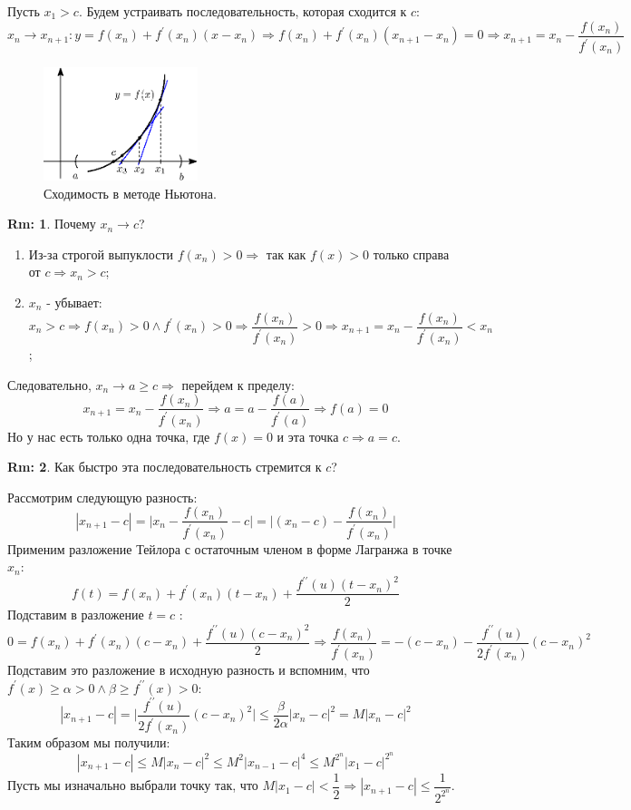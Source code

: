 \documentclass[12pt]{article}
\theoremstyle{definition}
\newtheorem{rem}{Rm:}
\begin{document}
Пусть $x_1 > c$. Будем устраивать последовательность, которая сходится к $c$: 
$$x_n \to x_{n+1} \colon y = f(x_n) + f^\prime(x_n)(x - x_n) \Rightarrow f(x_n) + f^\prime(x_n)(x_{n+1} - x_n) = 0 \Rightarrow x_{n+1} = x_n - \dfrac{ f(x_n)}{f^\prime(x_n)}$$
\begin{figure}[H]
	\centering
	\includegraphics[width=0.4\textwidth]{28_4.eps}
	\caption{Сходимость в методе Ньютона.}
	\label{28_4}
\end{figure}
\newpage
\begin{rem}
	Почему $x_n \to c$?
	\begin{enumerate}[label={(\arabic*)}]
		\item Из-за строгой выпуклости $f(x_{n}) > 0 \Rightarrow$ так как $f(x) > 0$ только справа от $c \Rightarrow  x_{n} > c$;
		\item $x_n$ - убывает: $x_n >c \Rightarrow f(x_n) > 0\wedge f^\prime(x_n) > 0 \Rightarrow \dfrac{f(x_n)}{f^\prime(x_n)}>0 \Rightarrow x_{n+1} = x_n - \dfrac{f(x_n)}{f^\prime(x_n)} < x_n$;
	\end{enumerate}
	Следовательно, $x_n \to a \geq c \Rightarrow $ перейдем к пределу: 
	$$x_{n+1} = x_n - \dfrac{f(x_n)}{f^\prime(x_n)} \Rightarrow a = a - \dfrac{f(a)}{f^\prime(a)} \Rightarrow f(a) = 0 $$ 
	Но у нас есть только одна точка, где $f(x) = 0$ и эта точка $c\Rightarrow a = c$.
\end{rem}

\begin{rem}
	Как быстро эта последовательность стремится к $c$? 
	
	Рассмотрим следующую разность:
	$$|x_{n+1} - c| = \bigg|x_n - \dfrac{f(x_n)}{f^\prime(x_n)} - c\bigg| = \bigg|(x_n - c) - \dfrac{f(x_n)}{f^\prime(x_n)}\bigg|$$
	Применим разложение Тейлора с остаточным членом в форме Лагранжа в точке $x_n$: 
	$$f(t) = f(x_n) + f^\prime(x_n)(t - x_n) + \dfrac{f^{\prime\prime}(u)(t - x_n)^2}{2}$$
	Подставим в разложение $t = c$ : 
	$$0 = f(x_n) + f^\prime(x_n)(c - x_n) + \dfrac{f^{\prime\prime}(u)(c - x_n)^2}{2} \Rightarrow \dfrac{f(x_n)}{f^\prime(x_n)} = - (c-x_n) - \dfrac{f^{\prime\prime}(u)}{2f^\prime(x_n)}(c - x_n)^2 $$
	Подставим это разложение в исходную разность и вспомним, что $f^\prime(x) \geq \alpha > 0 \wedge \beta \geq f^{\prime\prime}(x) > 0$:
	$$ |x_{n+1} - c| = \bigg|\dfrac{f^{\prime\prime}(u)}{2f^\prime(x_n)}(c - x_n)^2\bigg| \leq \dfrac{\beta}{2\alpha}|x_n - c|^2 = M|x_n - c|^2$$
	Таким образом мы получили:
	$$|x_{n+1} - c| \leq M|x_n - c|^2 \leq M^2|x_{n-1} - c|^4 \leq M^{2^{n}}|x_1 - c|^{2^{n}}$$
	Пусть мы изначально выбрали точку так, что $M|x_1 - c| < \dfrac{1}{2} \Rightarrow |x_{n+1} - c| \leq \dfrac{1}{2^{2^n}}$.
\end{rem}
\end{document}
